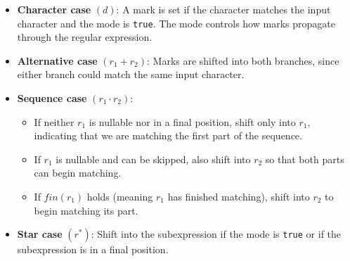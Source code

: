 \documentclass[12pt]{article}
\begin{document}
\begin{itemize}
  \item \textbf{Character case} $(d)$:  
  A mark is set if the character matches the input character and the mode is \texttt{true}.  
  The mode controls how marks propagate through the regular expression.

  \item \textbf{Alternative case} $(r_1 + r_2)$:  
  Marks are shifted into both branches, since either branch could match the same input character.

  \item \textbf{Sequence case} $(r_1 \cdot r_2)$:  
  \begin{itemize}
    \item If neither $r_1$ is nullable nor in a final position, shift only into $r_1$, indicating that we are matching the first part of the sequence.
    \item If $r_1$ is nullable and can be skipped, also shift into $r_2$ so that both parts can begin matching.
    \item If $\mathit{fin}(r_1)$ holds (meaning $r_1$ has finished matching), shift into $r_2$ to begin matching its part.
  \end{itemize}

  \item \textbf{Star case} $(r^*)$:  
  Shift into the subexpression if the mode is \texttt{true} or if the subexpression is in a final position.
\end{itemize}
\end{document}
